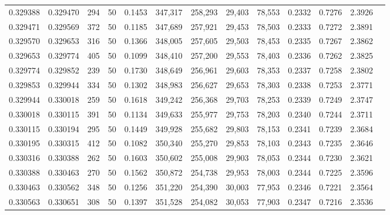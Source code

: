 \begin{tabular}{rrrrrrrrrrrrr}
0.329388 & 0.329470 &   294 &  50 &                                     0.1453 & 347,317 & 258,293 &  29,403 &  78,553 & 0.2332 & 0.7276 & 2.3926 \\
0.329471 & 0.329569 &   372 &  50 &                                     0.1185 & 347,689 & 257,921 &  29,453 &  78,503 & 0.2333 & 0.7272 & 2.3891 \\
0.329570 & 0.329653 &   316 &  50 &                                     0.1366 & 348,005 & 257,605 &  29,503 &  78,453 & 0.2335 & 0.7267 & 2.3862 \\
0.329653 & 0.329774 &   405 &  50 &                                     0.1099 & 348,410 & 257,200 &  29,553 &  78,403 & 0.2336 & 0.7262 & 2.3825 \\
0.329774 & 0.329852 &   239 &  50 &                                     0.1730 & 348,649 & 256,961 &  29,603 &  78,353 & 0.2337 & 0.7258 & 2.3802 \\
0.329853 & 0.329944 &   334 &  50 &                                     0.1302 & 348,983 & 256,627 &  29,653 &  78,303 & 0.2338 & 0.7253 & 2.3771 \\
0.329944 & 0.330018 &   259 &  50 &                                     0.1618 & 349,242 & 256,368 &  29,703 &  78,253 & 0.2339 & 0.7249 & 2.3747 \\
0.330018 & 0.330115 &   391 &  50 &                                     0.1134 & 349,633 & 255,977 &  29,753 &  78,203 & 0.2340 & 0.7244 & 2.3711 \\
0.330115 & 0.330194 &   295 &  50 &                                     0.1449 & 349,928 & 255,682 &  29,803 &  78,153 & 0.2341 & 0.7239 & 2.3684 \\
0.330195 & 0.330315 &   412 &  50 &                                     0.1082 & 350,340 & 255,270 &  29,853 &  78,103 & 0.2343 & 0.7235 & 2.3646 \\
0.330316 & 0.330388 &   262 &  50 &                                     0.1603 & 350,602 & 255,008 &  29,903 &  78,053 & 0.2344 & 0.7230 & 2.3621 \\
0.330388 & 0.330463 &   270 &  50 &                                     0.1562 & 350,872 & 254,738 &  29,953 &  78,003 & 0.2344 & 0.7225 & 2.3596 \\
0.330463 & 0.330562 &   348 &  50 &                                     0.1256 & 351,220 & 254,390 &  30,003 &  77,953 & 0.2346 & 0.7221 & 2.3564 \\
0.330563 & 0.330651 &   308 &  50 &                                     0.1397 & 351,528 & 254,082 &  30,053 &  77,903 & 0.2347 & 0.7216 & 2.3536 \\

\end{tabular}
